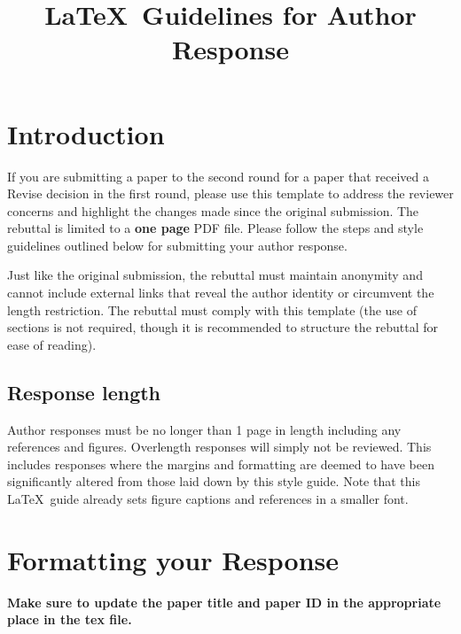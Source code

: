 \documentclass[10pt,twocolumn,letterpaper]{article}
\begin{document}
\title{\LaTeX\ Guidelines for Author Response}  %

\maketitle
\thispagestyle{empty}
\appendix

\section{Introduction}

If you are submitting a paper to the second round for a paper that received a
Revise decision in the first round, please use this template to
address the reviewer concerns and highlight the changes made since the
original submission. The rebuttal is limited to a {\bf one page}
PDF file.  Please follow the steps and style guidelines outlined below
for submitting your author response.


Just like the original submission, the rebuttal must maintain anonymity and cannot include external links that reveal the author identity or circumvent the length restriction.
The rebuttal must comply with this template (the use of sections is not required, though it is recommended to structure the rebuttal for ease of reading).


\subsection{Response length}
Author responses must be no longer than 1 page in length including any references and figures.
Overlength responses will simply not be reviewed.
This includes responses where the margins and formatting are deemed to have been significantly altered from those laid down by this style guide.
Note that this \LaTeX\ guide already sets figure captions and references in a smaller font.

\section{Formatting your Response}

{\bf Make sure to update the paper title and paper ID in the appropriate place in the tex file.}
\end{document}
